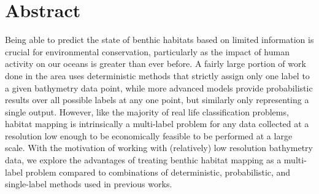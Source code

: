 \chapter*{Abstract}

Being able to predict the state of benthic habitats based on limited information is crucial for environmental conservation, particularly as the impact of human activity on our oceans is greater than ever before. A fairly large portion of work done in the area uses deterministic methods that strictly assign only one label to a given bathymetry data point, while more advanced models provide probabilistic results over all possible labels at any one point, but similarly only representing a single output. However, like the majority of real life classification problems, habitat mapping is intrinsically a multi-label problem for any data collected at a resolution low enough to be economically feasible to be performed at a large scale. With the motivation of working with (relatively) low resolution bathymetry data, we explore the advantages of treating benthic habitat mapping as a multi-label problem compared to combinations of deterministic, probabilistic, and single-label methods used in previous works.
